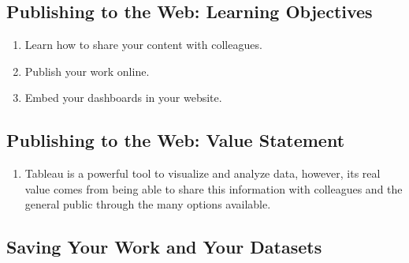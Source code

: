 \documentclass[
]{book}
\providecommand{\tightlist}{%
  \setlength{\itemsep}{0pt}\setlength{\parskip}{0pt}}
\begin{document}
\hypertarget{publishing-to-the-web-learning-objectives}{%
\subsection{Publishing to the Web: Learning Objectives}\label{publishing-to-the-web-learning-objectives}}

\begin{enumerate}
\def\labelenumi{\arabic{enumi}.}
\tightlist
\item
  Learn how to share your content with colleagues.
\item
  Publish your work online.
\item
  Embed your dashboards in your website.
\end{enumerate}

\hypertarget{publishing-to-the-web-value-statement}{%
\subsection{Publishing to the Web: Value Statement}\label{publishing-to-the-web-value-statement}}

\begin{enumerate}
\def\labelenumi{\arabic{enumi}.}
\tightlist
\item
  Tableau is a powerful tool to visualize and analyze data, however, its real value comes from being able to share this information with colleagues and the general public through the many options available.
\end{enumerate}

\hypertarget{saving-your-work-and-your-datasets}{%
\subsection{Saving Your Work and Your Datasets}\label{saving-your-work-and-your-datasets}}
\end{document}
